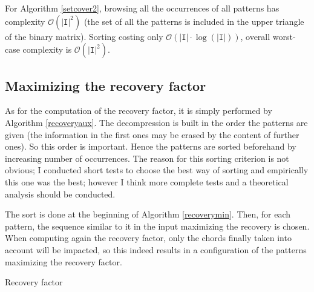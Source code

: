 \documentclass[a4paper,10pt]{article}
\newcommand{\bigO}[1]{\mathcal O\left( #1 \right)}
\begin{document}
For Algorithm \ref{setcover2}, browsing all the occurrences of all patterns has complexity $\bigO{|\texttt{I}|^2}$ (the set of all the patterns is included in the upper triangle of the binary matrix). Sorting costing only $\bigO{|\texttt{I}|\cdot\log(|\texttt{I}|)}$, overall worst-case complexity is $\bigO{|\texttt{I}|^2}$.


\subsection*{Maximizing the recovery factor}

As for the computation of the recovery factor, it is simply performed by Algorithm \ref{recoveryaux}. The decompression is built in the order the patterns are given (the information in the first ones may be erased by the content of further ones). So this order is important. Hence the patterns are sorted beforehand by increasing number of occurrences. The reason for this sorting criterion is not obvious; I conducted short tests to choose the best way of sorting and empirically this one was the best; however I think more complete tests and a theoretical analysis should be conducted.

The sort is done at the beginning of Algorithm \ref{recoverymin}. Then, for each pattern, the sequence similar to it in the input maximizing the recovery is chosen. When computing again the recovery factor, only the chords finally taken into account will be impacted, so this indeed results in a configuration of the patterns maximizing the recovery factor.

\begin{algorithm}
\caption{Recovery factor \label{recoveryaux}}
 
     
  


\end{algorithm}
\end{document}
